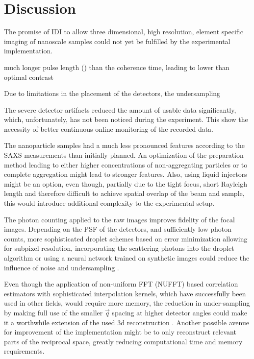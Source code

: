 \chapter{Discussion}
The promise of IDI to allow three dimensional, high resolution, element specific imaging of nanoscale samples could not yet be fulfilled by the experimental implementation.

 
much longer pulse length () than the coherence time, leading to lower than optimal contrast

Due to limitations in the placement of the detectors, the undersampling


The severe detector artifacts reduced the amount of usable data significantly, which, unfortunately, has not been noticed during the experiment. This show the necessity of better continuous online monitoring of the recorded data.


The nanoparticle samples had a much less pronounced features according to the SAXS measurements than initially planned. An optimization of the preparation method leading to either higher concentrations of non-aggregating particles or to complete aggregation might lead to stronger features. Also, using liquid injectors might be an option, even though, partially due to the tight focus, short Rayleigh length and therefore difficult to achieve spatial overlap of the beam and sample, this would introduce additional complexity to the experimental setup.





The photon counting applied to the raw images improves fidelity of the focal images. Depending on the PSF of the detectors, and sufficiently low photon counts, more sophisticated droplet schemes based on error minimization allowing for subpixel resolution, incorporating the scattering photons into the droplet algorithm or using a neural network trained on synthetic images could reduce the influence of noise and undersampling \cite{baumann2018,collaboration2014,schayck2020,sun2020}.

Even though the application of non-uniform FFT (NUFFT) based correlation estimators with sophisticated interpolation kernels, which have  successfully been used in other fields, would require more memory, the reduction in under-sampling by making full use of the smaller $\vec{q}$ spacing at higher detector angles could make it a worthwhile extension of the used 3d reconstruction \cite{laguna1998,yang2008,chang2020}. Another possible avenue for improvement of the implementation might be to only reconstruct relevant parts of the reciprocal space, greatly reducing computational time and memory requirements. 



